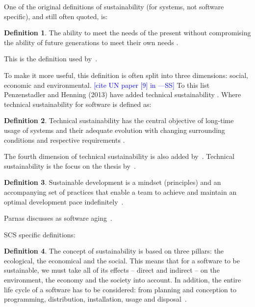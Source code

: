\documentclass[letterpaper,cleveref]{lipics-v2019}
\newcommand{\authornote}[3]{\textcolor{#1}{[#3 ---#2]}}
\newcommand{\authornote}[3]{}
\newcommand{\wss}[1]{\authornote{blue}{SS}{#1}} %
\theoremstyle{definition}
\newtheorem{defn}{Definition}
\begin{document}
One of the original definitions of sustainability (for systems, not software
specific), and still often quoted, is:

\begin{defn}
\noindent The ability to meet the needs of the present without compromising the ability of
future generations to meet their own needs \cite{Brundtland1987}.
\end{defn}

This is the definition used by~\cite{IISD2019}.

To make it more useful, this definition is often split into three dimensions:
social, economic and environmental. \wss{cite UN paper [9] in
  \cite{PenzenstadlerAndHenning2013}}  To this list Penzenstadler and Henning
(2013) have added technical sustainability \cite{PenzenstadlerAndHenning2013}.
Where technical sustainability for software is defined as:

\begin{defn}
\noindent Technical sustainability has the central objective of long-time
usage of systems and their adequate evolution with changing surrounding
conditions and respective requirements \cite{PenzenstadlerAndHenning2013}.
\end{defn}

The fourth dimension of technical sustainability is also added
by~\cite{WolframEtAl2017}.  Technical sustainability is the focus on the thesis
by~\cite{Hygerth2016}.

\begin{defn}
  \noindent Sustainable development is a mindset (principles) and an
  accompanying set of practices that enable a team to achieve and maintain an
  optimal development pace indefinitely~\cite{Tate2005}.
\end{defn}

Parnas discusses as software aging~\cite{Parnas1994a}.

SCS specific definitions:

\begin{defn}
  The concept of sustainability is based on three pillars: the
  ecological, the economical and the social. This means that for a software to
  be sustainable, we must take all of its effects -- direct and indirect -- on
  the environment, the economy and the society into account. In addition, the
  entire life cycle of a software has to be considered: from planning and
  conception to programming, distribution, installation, usage and
  disposal~\cite{Heine2017}.
\end{defn}
\end{document}
